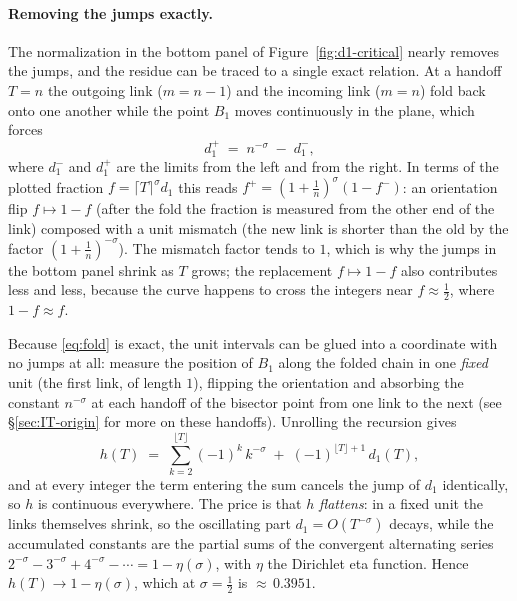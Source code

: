 \documentclass[11pt]{article}
\theoremstyle{definition}
\begin{document}
\paragraph{Removing the jumps exactly.} The normalization in the bottom panel
of Figure~\ref{fig:d1-critical} nearly removes the jumps, and the residue can
be traced to a single exact relation. At a handoff $T=n$ the outgoing link
($m=n-1$) and the incoming link ($m=n$) fold back onto one another while the
point $B_1$
moves continuously in the plane, which forces
\begin{equation}\label{eq:fold}
d_1^{+} \;=\; n^{-\sigma} \;-\; d_1^{-},
\end{equation}
where $d_1^{-}$ and $d_1^{+}$ are the limits from the left and from the right.
In terms of the plotted fraction $f=\lceil T\rceil^{\sigma} d_1$ this reads
$f^{+}=(1+\tfrac1n)^{\sigma}(1-f^{-})$: an orientation flip $f\mapsto 1-f$
(after the fold the fraction is measured from the other end of the link)
composed with a unit mismatch (the new link is shorter than the old by the
factor $(1+\tfrac1n)^{-\sigma}$). The mismatch factor tends to $1$, which is
why the jumps in the bottom panel shrink as $T$ grows; the replacement
$f\mapsto 1-f$ also contributes less and less, because the curve happens to
cross the integers near $f\approx\tfrac12$, where $1-f\approx f$.

Because \eqref{eq:fold} is exact, the unit intervals can be glued into a
coordinate with no jumps at all: measure the position of $B_1$
along the folded chain in one \emph{fixed} unit (the first link, of length
$1$), flipping the orientation and absorbing the constant $n^{-\sigma}$ at
each handoff of the bisector point from one link to the next (see
\S\ref{sec:IT-origin} for more on these handoffs). Unrolling the
recursion gives
\begin{equation}\label{eq:h-cont}
h(T) \;=\; \sum_{k=2}^{\lfloor T\rfloor} (-1)^{k}\,k^{-\sigma}
\;+\; (-1)^{\lfloor T\rfloor+1}\, d_1(T),
\end{equation}
and at every integer the term entering the sum cancels the jump of $d_1$
identically, so $h$ is continuous everywhere. The price is that $h$
\emph{flattens}: in a fixed unit the links themselves shrink, so the
oscillating part $d_1=O(T^{-\sigma})$ decays, while the accumulated constants
are the partial sums of the convergent alternating series
$2^{-\sigma}-3^{-\sigma}+4^{-\sigma}-\cdots = 1-\eta(\sigma)$, with $\eta$ the
Dirichlet eta function. Hence $h(T)\to 1-\eta(\sigma)$, which at
$\sigma=\tfrac12$ is ${\approx}\,0.3951$.
\end{document}
